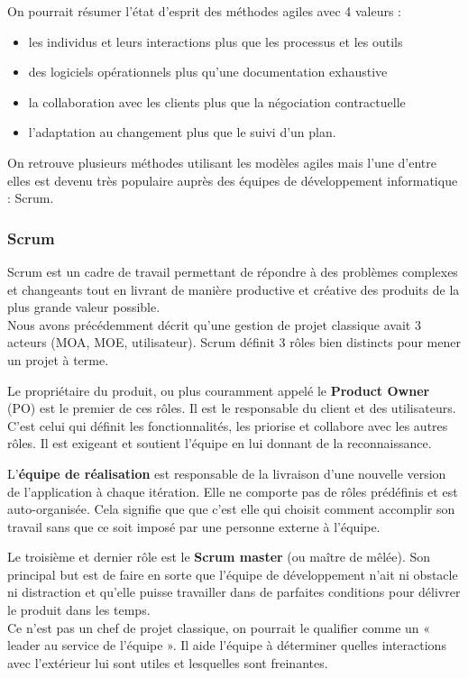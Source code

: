 \documentclass[12pt]{report}
\begin{document}
On pourrait résumer l'état d'esprit des méthodes agiles avec 4 valeurs :
\begin{itemize}
\item les individus et leurs interactions plus que les processus et les outils
\item des logiciels opérationnels plus qu'une documentation exhaustive
\item la collaboration avec les clients plus que la négociation contractuelle
\item l'adaptation au changement plus que le suivi d'un plan\cite{gitagile}.
\end{itemize}
On retrouve plusieurs méthodes utilisant les modèles agiles mais l'une d'entre elles est devenu très populaire auprès des équipes de développement informatique : Scrum.

\subsubsection{Scrum}

Scrum est un cadre de travail permettant de répondre à des problèmes complexes et changeants tout en livrant de manière productive et créative des produits de la plus grande valeur possible\cite{gitagile}.~~\\
Nous avons précédemment décrit qu'une gestion de projet classique avait 3 acteurs (MOA, MOE, utilisateur). Scrum définit 3 rôles bien distincts pour mener un projet à terme.

Le propriétaire du produit, ou plus couramment appelé le \textbf{Product Owner} (PO) est le premier de ces rôles. Il est le responsable du client et des utilisateurs. C'est celui qui définit les fonctionnalités, les priorise et collabore avec les autres rôles. Il est exigeant et soutient l'équipe en lui donnant de la reconnaissance\cite{wikienscrum}.

L'\textbf{équipe de réalisation} est responsable de la livraison d'une nouvelle version de l'application à chaque itération. Elle ne comporte pas de rôles prédéfinis et est auto-organisée. Cela signifie que que c'est elle qui choisit comment accomplir son travail sans que ce soit imposé par une personne externe à l'équipe.

Le troisième et dernier rôle est le \textbf{Scrum master} (ou maître de mêlée). Son principal but est de faire en sorte que l'équipe de développement n'ait ni obstacle ni distraction et qu'elle puisse travailler dans de parfaites conditions pour délivrer le produit dans les temps.~~\\
Ce n'est pas un chef de projet classique, on pourrait le qualifier comme un « leader au service de l'équipe ». Il aide l'équipe à déterminer quelles interactions avec l'extérieur lui sont utiles et lesquelles sont freinantes.
\end{document}
